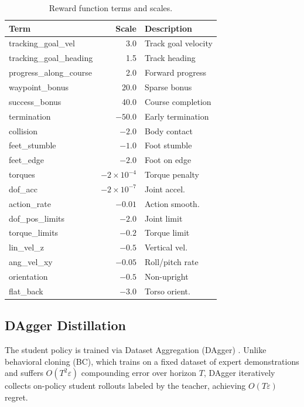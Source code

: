 \documentclass[10pt,twocolumn]{article}
\begin{document}
\begin{table}[h]
  \centering
  \caption{Reward function terms and scales.}
  \label{tab:rewards}
  \small
  \begin{tabular}{@{}p{3.2cm}rl@{}}
    \toprule
    Term & Scale & Description \\
    \midrule
    tracking\_goal\_vel & 3.0 & Track goal velocity \\
    tracking\_goal\_heading & 1.5 & Track heading \\
    progress\_along\_course & 2.0 & Forward progress \\
    waypoint\_bonus & 20.0 & Sparse bonus \\
    success\_bonus & 40.0 & Course completion \\
    termination & $-50.0$ & Early termination \\
    collision & $-2.0$ & Body contact \\
    feet\_stumble & $-1.0$ & Foot stumble \\
    feet\_edge & $-2.0$ & Foot on edge \\
    torques & $-2{\times}10^{-4}$ & Torque penalty \\
    dof\_acc & $-2{\times}10^{-7}$ & Joint accel. \\
    action\_rate & $-0.01$ & Action smooth. \\
    dof\_pos\_limits & $-2.0$ & Joint limit \\
    torque\_limits & $-0.2$ & Torque limit \\
    lin\_vel\_z & $-0.5$ & Vertical vel. \\
    ang\_vel\_xy & $-0.05$ & Roll/pitch rate \\
    orientation & $-0.5$ & Non-upright \\
    flat\_back & $-3.0$ & Torso orient. \\
    \bottomrule
  \end{tabular}
\end{table}

\subsection{DAgger Distillation}
\label{sec:dagger}

The student policy is trained via Dataset Aggregation (DAgger)
\cite{ross2011reduction}.  Unlike behavioral cloning (BC), which
trains on a fixed dataset of expert demonstrations and suffers
$O(T^2 \varepsilon)$ compounding error over horizon $T$, DAgger
iteratively collects on-policy student rollouts labeled by the
teacher, achieving $O(T\varepsilon)$ regret.
\end{document}
